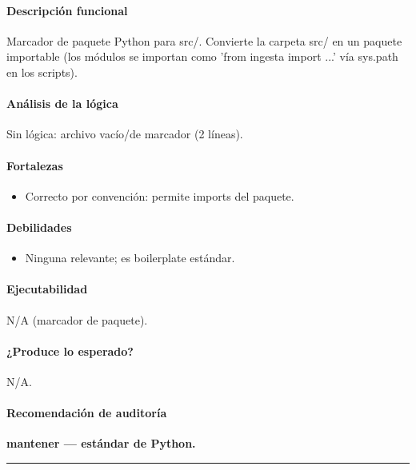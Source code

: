 \paragraph{Descripción funcional}
Marcador de paquete Python para src/. Convierte la carpeta src/ en un paquete importable (los módulos se importan como 'from ingesta import ...' vía sys.path en los scripts).

\paragraph{Análisis de la lógica}
Sin lógica: archivo vacío/de marcador (2 líneas).

\paragraph{Fortalezas}
\begin{itemize}
  \item Correcto por convención: permite imports del paquete.
\end{itemize}

\paragraph{Debilidades}
\begin{itemize}
  \item Ninguna relevante; es boilerplate estándar.
\end{itemize}

\paragraph{Ejecutabilidad}
N/A (marcador de paquete).

\paragraph{¿Produce lo esperado?}
N/A.

\paragraph{Recomendación de auditoría}
\textbf{mantener --- estándar de Python.}

\medskip
\hrule

